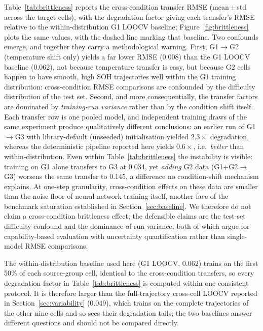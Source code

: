 Table~\ref{tab:brittleness} reports the cross-condition transfer RMSE
(mean\,$\pm$\,std across the target cells), with the degradation factor giving
each transfer's RMSE relative to the within-distribution G1 LOOCV baseline;
Figure~\ref{fig:brittleness} plots the same values, with the dashed line marking
that baseline.
Two confounds emerge, and together they carry a methodological warning.
First, G1$\rightarrow$G2 (temperature shift only) yields a far lower RMSE
(0.008) than the G1 LOOCV baseline (0.062), not because temperature
transfer is easy, but because G2 cells happen to have smooth, high SOH
trajectories well within the G1 training distribution: cross-condition RMSE
comparisons are confounded by the difficulty distribution of the test set.
Second, and more consequentially, the transfer factors are dominated by
\emph{training-run variance} rather than by the condition shift itself.
Each transfer row is one pooled model, and independent training draws of the
same experiment produce qualitatively different conclusions: an earlier run
of G1$\rightarrow$G3 with library-default (unseeded) initialisation yielded
$2.3\times$ degradation, whereas the deterministic pipeline reported here
yields $0.6\times$, i.e.\ \emph{better} than within-distribution.
Even within Table~\ref{tab:brittleness} the instability is visible:
training on G1 alone transfers to G3 at 0.034, yet \emph{adding} G2 data
(G1+G2$\rightarrow$G3) worsens the same transfer to 0.145, a difference no
condition-shift mechanism explains.
At one-step granularity, cross-condition effects on these data are smaller
than the noise floor of neural-network training itself, another face of the
benchmark saturation established in Section~\ref{sec:baseline}.
We therefore do not claim a cross-condition brittleness effect; the
defensible claims are the test-set difficulty confound and the dominance of
run variance, both of which argue for capability-based evaluation with
uncertainty quantification rather than single-model RMSE comparisons.

The within-distribution baseline used here (G1 LOOCV, $0.062$) trains on the
first 50\% of each source-group cell, identical to the cross-condition
transfers, so every degradation factor in Table~\ref{tab:brittleness} is
computed within one consistent protocol.
It is therefore larger than the full-trajectory cross-cell LOOCV reported in
Section~\ref{sec:variability} ($0.049$), which trains on the complete
trajectories of the other nine cells and so sees their degradation tails; the
two baselines answer different questions and should not be compared directly.

